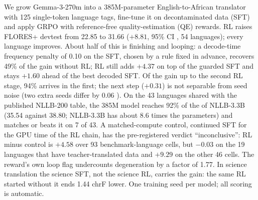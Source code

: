 We grow Gemma-3-270m into a 385M-parameter English-to-African translator with 125 single-token language tags, fine-tune it on decontaminated data (SFT) and apply GRPO with reference-free quality-estimation (QE) rewards. RL raises FLORES+ devtest \chrfpp{} from 22.85 to 31.66 ($+8.81$, 95\% CI , 54 languages); every language improves. About half of this is finishing and looping: a decode-time frequency penalty of 0.10 on the SFT, chosen by a rule fixed in advance, recovers 49\% of the \chrfpp{} gain without RL; RL still adds $+4.37$  \chrfpp{} on top of the guarded SFT and stays $+1.60$  ahead of the best decoded SFT. Of the gain up to the second RL stage, 94\% arrives in the first; the next step ($+0.31$) is not separable from seed noise (two extra seeds differ by 0.06 ). On the 43 languages shared with the published NLLB-200 table, the 385M model reaches 92\% of the \chrfpp{} of NLLB-3.3B (35.54 against 38.80; NLLB-3.3B has about 8.6 times the parameters) and matches or beats it on 7 of 43. A matched-compute control, continued SFT for the GPU time of the RL chain, has the pre-registered verdict ``inconclusive'': RL minus control is $+4.58$  over 93 benchmark-language cells, but $-0.03$  on the 19 languages that have teacher-translated data and $+9.29$ on the other 46 cells. The reward's own loop flag undercounts degeneration by a factor of 1.77. In science translation the science SFT, not the science RL, carries the gain: the same RL started without it ends 1.44 chrF  lower. One training seed per model; all scoring is automatic.
